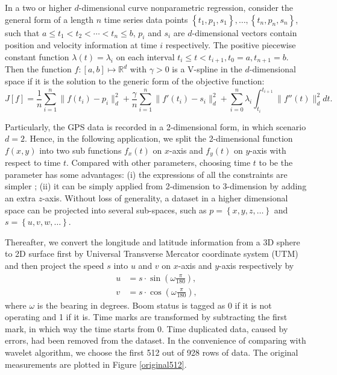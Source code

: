 In a two or higher $d$-dimensional curve nonparametric regression, consider the general form of a length $n$ time series data points $\left\lbrace t_1,p_1,s_1\right\rbrace, \ldots, \left\lbrace t_n,p_n,s_n\right\rbrace$, such that $a \leq t_1<t_2< \cdots < t_n \leq b$, $p_i$ and $s_i$ are $d$-dimensional vectors contain position and velocity information at time $i$ respectively. The positive piecewise constant function $\lambda(t) = \lambda_i$ on each interval $t_i \leq t<t_{i+1}, t_0=a, t_{n+1}=b$.  Then the function $f:[a,b]\mapsto\mathbb{R}^d$ with $\gamma>0$ is a V-spline in the $d$-dimensional space if it is the solution to the generic form of the objective function: 
\begin{equation}\label{tractorsplineObjective2D}
J[f]= \frac{1}{n} \sum_{i=1}^{n} \lVert f(t_i)-p_i\rVert_d^2 + \frac{\gamma}{n} \sum_{i=1}^{n} \lVert f'(t_i)-s_i \rVert_d^2 +\sum_{i=0}^{n} \lambda_i\int_{t_i}^{t_{i+1}} \lVert f''(t)\rVert_d^2 dt. 
\end{equation}


Particularly, the GPS data is recorded in a 2-dimensional form, in which scenario $d=2$. Hence, in the following application, we split the 2-dimensional function $f(x,y)$ into two sub functions $f_x(t)$ on $x$-axis and $f_y(t)$ on $y$-axis with respect to time $t$. Compared with other parameters, choosing time $t$ to be the parameter has some advantages: (i) the expressions of all the constraints are simpler \citep{zhang2013cubic}; (ii) it can be simply applied from 2-dimension to 3-dimension by adding an extra $z$-axis. Without loss of generality, a dataset in a higher dimensional space can be projected into several sub-spaces, such as $p=\left\lbrace x,y,z,\ldots \right\rbrace$ and $s=\left\lbrace u,v,w,\ldots \right\rbrace$. 


Thereafter, we convert the longitude and latitude information from a 3D sphere to 2D surface first by Universal Transverse Mercator coordinate system (UTM) and then project the speed $s$ into $u$ and $v$ on $x$-axis and $y$-axis respectively by 
\begin{align}
u &=s\cdot \sin \left(\omega\frac{\pi}{180}\right),\\
v &= s\cdot \cos \left(\omega\frac{\pi}{180}\right),
\end{align}
where $\omega$ is the bearing in degrees. Boom status is tagged as 0 if it is not operating and 1 if it is. Time marks are transformed by subtracting the first mark, in which way the time starts from 0. Time duplicated data, caused by errors, had been removed from the dataset. In the convenience of comparing with wavelet algorithm, we choose the first 512 out of 928 rows of data. The original measurements are plotted in Figure \ref{original512}.


